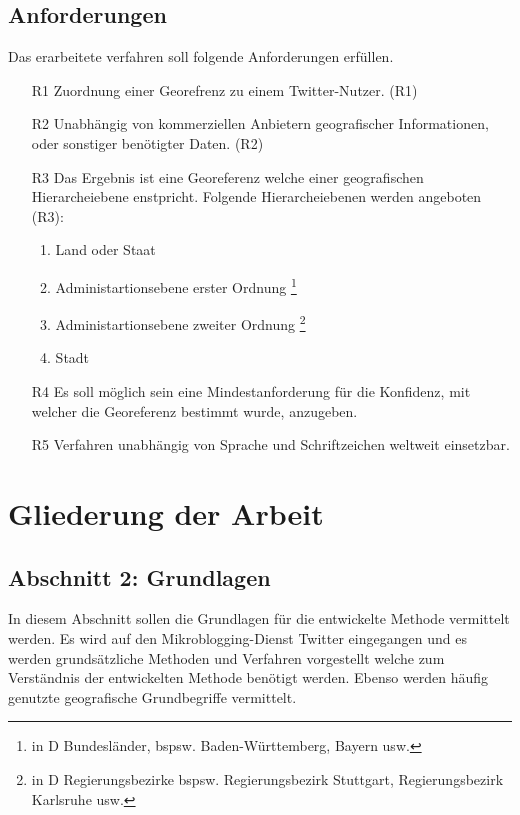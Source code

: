 	\subsection{Anforderungen}\label{sec:Anforderungen}
	Das erarbeitete verfahren soll folgende Anforderungen erfüllen.
		\begin{enumerate}
			\item[R1] Zuordnung einer Georefrenz zu einem Twitter-Nutzer. (R1) 
			\item[R2] Unabhängig von kommerziellen Anbietern geografischer Informationen, oder sonstiger benötigter Daten. (R2)
			\item[R3] Das Ergebnis ist eine Georeferenz welche einer geografischen Hierarcheiebene enstpricht. Folgende Hierarcheiebenen werden angeboten (R3): 
			\begin{enumerate}
			 	\item Land oder Staat
			 	\item Administartionsebene erster Ordnung \footnote{in D Bundesländer, bspsw. Baden-Württemberg, Bayern usw. }
			 	\item Administartionsebene zweiter Ordnung \footnote{in D Regierungsbezirke bspsw. Regierungsbezirk Stuttgart, Regierungsbezirk Karlsruhe usw.}
			 	\item Stadt
			 \end{enumerate} 
			\item[R4] Es soll möglich sein eine Mindestanforderung für die Konfidenz, mit welcher die Georeferenz bestimmt wurde, anzugeben.  
			\item[R5] Verfahren unabhängig von Sprache und Schriftzeichen weltweit einsetzbar.
		\end{enumerate}
		
	\section{Gliederung der Arbeit}

		\subsection*{Abschnitt 2: Grundlagen}
			In diesem Abschnitt sollen die Grundlagen für die entwickelte Methode vermittelt werden. 
			Es wird auf den Mikroblogging-Dienst Twitter eingegangen und es werden grundsätzliche Methoden und Verfahren vorgestellt welche zum Verständnis der entwickelten Methode benötigt werden. 
			Ebenso werden häufig genutzte geografische Grundbegriffe vermittelt.

